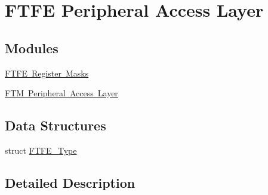 \hypertarget{group___f_t_f_e___peripheral___access___layer}{}\section{F\+T\+FE Peripheral Access Layer}
\label{group___f_t_f_e___peripheral___access___layer}
\subsection*{Modules}
\begin{DoxyCompactItemize}
\item 
\mbox{\hyperlink{group___f_t_f_e___register___masks}{F\+T\+F\+E Register Masks}}
\item 
\mbox{\hyperlink{group___f_t_m___peripheral___access___layer}{F\+T\+M Peripheral Access Layer}}
\end{DoxyCompactItemize}
\subsection*{Data Structures}
\begin{DoxyCompactItemize}
\item 
struct \mbox{\hyperlink{struct_f_t_f_e___type}{F\+T\+F\+E\+\_\+\+Type}}
\end{DoxyCompactItemize}


\subsection{Detailed Description}
